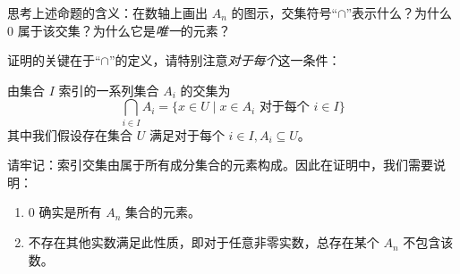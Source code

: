 思考上述命题的含义：在数轴上画出 $A_n$ 的图示，交集符号``$\cap$''表示什么？为什么 $0$ 属于该交集？为什么它是\emph{唯一}的元素？

证明的关键在于``$\cap$''的定义，请特别注意\emph{对于每个}这一条件：

\begin{definition}
    由集合 $I$ 索引的一系列集合 $A_i$ 的交集为
    \[\bigcap_{i \in I} A_i = \{x \in U \mid x \in A_i \text{\ 对于每个\ } i \in I\}\]
    其中我们假设存在集合 $U$ 满足对于每个 $i \in I, A_i \subseteq U$。
\end{definition}

请牢记：索引交集由属于所有成分集合的元素构成。因此在证明中，我们需要说明：
\begin{enumerate}[label=(\arabic*)]
    \item $0$ 确实是所有 $A_n$ 集合的元素。
    \item 不存在其他实数满足此性质，即对于任意非零实数，总存在某个 $A_n$ 不包含该数。
\end{enumerate} 

